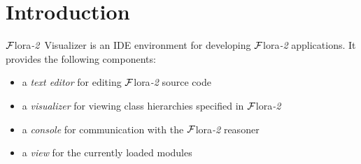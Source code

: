 \documentclass[a4paper,11pt]{article}
\newcommand{\FLORA}{{\mbox{\sc ${\cal F}${lora}\rm\emph{-2}}}\xspace}
\newcommand{\FVIZ}{{\mbox{\sc ${\cal F}${lora}\rm\emph{-2} {Visualizer}}}\xspace}
\begin{document}






\section{Introduction}
\label{sec:introduction}

\FVIZ is an IDE environment for
developing \FLORA applications. It provides the following components:
\begin{itemize}
	\item a \emph{text editor} for editing \FLORA source code
	\item a \emph{visualizer} for viewing class hierarchies specified
          in \FLORA
	\item a \emph{console} for communication with the \FLORA reasoner
	\item a \emph{view} for the currently loaded modules
\end{itemize}
\end{document}
